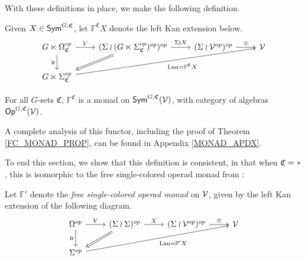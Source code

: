 \documentclass[a4paper,10pt
,draft
]{article}%
\renewcommand{\1}{\eta}%
\begin{document}
With these definitions in place, we make the following definition.

\begin{definition}
      Given $X \in \mathsf{Sym}^{G, \mathfrak C}$, let $\mathbb F^{\mathfrak C} X$ denote the left Kan extension below.
      \begin{equation} 
            \begin{tikzcd}
                  G \ltimes \Omega_{\mathfrak C}^{op}
                  \arrow[d, "\mathsf{lr}"']
                  \arrow[r, "V"]
                  &
                  (\Sigma \wr (G \ltimes \Sigma_{\mathfrak C}^{op})^{op})^{op} \arrow[r, "\Sigma \wr X"]
                  \arrow[dl, Rightarrow]
                  &
                  (\Sigma \wr \V^{op})^{op} \arrow[r, "\otimes"]
                  &
                  \V
                  \\
                  G \ltimes \Sigma_{\mathfrak C}^{op} \arrow[urrr, "\Lan = \mathbb F^{\mathfrak C} X"']
            \end{tikzcd}
      \end{equation}
\end{definition}

\begin{theorem}
      \label{FC_MONAD_PROP}
      For all $G$-sets $\mathfrak C$,
      $\mathbb F^{\mathfrak C}$ is a monad on $\mathsf{Sym}^{G, \mathfrak C}(\mathcal V)$,
      with category of algebras $\mathsf{Op}^{G, \mathfrak C}(\mathcal V)$.
\end{theorem}

A complete analysis of this functor, including the proof of Theorem \ref{FC_MONAD_PROP},
can be found in Appendix \ref{MONAD_APDX}.

To end this section, we show that this definition is consistent,
in that when $\mathfrak C = \**$, this is isomorphic to the free single-colored operad monad from \cite[{Eq. (4.1)}]{BP_geo}:



\begin{notation}
      Let $\mathbb F'$ denote the \textit{free single-colored operad monad} on $\mathcal V$, given by the left Kan extension of the following diagram.
      \begin{equation}
            \begin{tikzcd}
                  \Omega^{op}
                  \arrow[d, "\mathsf{lr}"']
                  \arrow[r, "V"]
                  &
                  (\Sigma \wr \Sigma)^{op} \arrow[r, "X"]
                  \arrow[dl, Rightarrow]
                  &
                  (\Sigma \wr \V^{op})^{op} \arrow[r, "\otimes"]
                  &
                  \V
                  \\
                  \Sigma^{op} \arrow[urrr, "\Lan = \mathbb F' X"']
            \end{tikzcd}
      \end{equation}
\end{notation}
\end{document}
